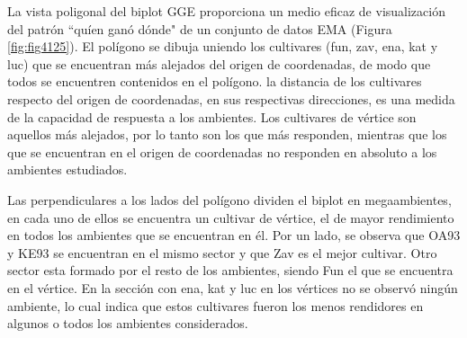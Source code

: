 

La vista poligonal del biplot GGE proporciona un medio eficaz de visualización del patrón ``quíen ganó dónde" de un conjunto de datos EMA (Figura \ref{fig:fig4125}). El polígono se dibuja uniendo los cultivares (fun, zav, ena, kat y luc) que se encuentran más alejados del origen de coordenadas, de modo que todos se encuentren contenidos en el polígono. la distancia de los cultivares respecto del origen de coordenadas, en sus respectivas direcciones, es una medida de la capacidad de respuesta a los ambientes. Los cultivares de vértice son aquellos más alejados, por lo tanto son los que más responden, mientras que los que se encuentran en el origen de coordenadas no responden en absoluto a los ambientes estudiados.

Las perpendiculares a los lados del polígono dividen el biplot en megaambientes, en cada uno de ellos se encuentra un cultivar de vértice, el de mayor rendimiento en todos los ambientes que se encuentran en él. Por un lado, se observa que OA93 y KE93 se encuentran en el mismo sector y que Zav es el mejor cultivar. Otro sector esta formado por el resto de los ambientes, siendo Fun el que se encuentra en el vértice. En la sección con ena, kat y luc en los vértices no se observó ningún ambiente, lo cual indica que estos cultivares fueron los menos rendidores en algunos o todos los ambientes considerados.

